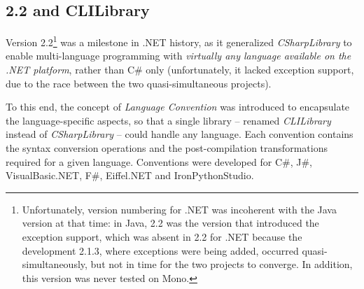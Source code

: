 \subsection{\tuprolog{} 2.2 and CLILibrary}
\label{ssec:dotnet-tuprolog2.2}

Version 2.2\footnote{%
    Unfortunately, version numbering for .NET was incoherent with the Java version at that time: in Java, 2.2 was the version that introduced the exception support, which was absent in 2.2 for .NET because the development \tuprolog{} 2.1.3, where exceptions were being added, occurred quasi-simultaneously, but not in time for the two projects to converge. In addition, this version was never tested on Mono.
} was a milestone in \tuprolog{}.NET history, as it generalized \textit{CSharpLibrary} to enable multi-language programming with \textit{virtually any language available on the .NET platform}, rather than C\# only (unfortunately, it lacked exception support, due to the race between the two quasi-simultaneous projects).

To this end, the concept of \textit{Language Convention} was introduced to encapsulate the language-specific aspects, so that a single library -- renamed \textit{CLILibrary} instead of \textit{CSharpLibrary} -- could handle any language.
%
Each convention contains the syntax conversion operations and the post-compilation transformations required for a given language.
Conventions were developed for C\#, J\#, VisualBasic.NET, F\#, Eiffel.NET and
IronPythonStudio.

